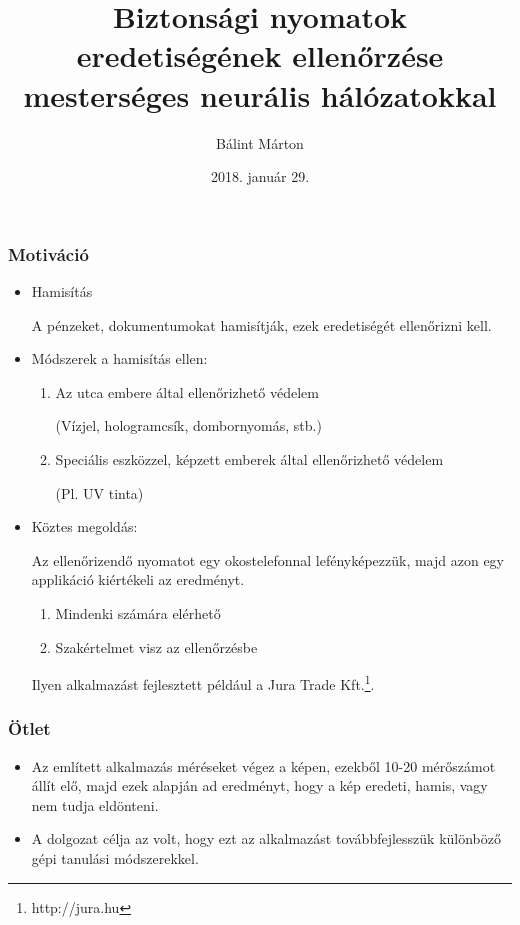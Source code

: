 \documentclass[11pt]{beamer}
\author{Bálint Márton}
\title[Diplomamunka]{Biztonsági nyomatok eredetiségének ellenőrzése mesterséges neurális hálózatokkal}
\institute[ELTE]{Eötvös Loránd Tudományegyetem}
\date{2018. január 29.}
\begin{document}
	
\begin{frame}[plain]
	\maketitle
\end{frame}

\begin{frame}
	\frametitle{Motiváció}
	
	\begin{itemize}
	\item 
		Hamisítás
		
		A pénzeket, dokumentumokat hamisítják, ezek eredetiségét ellenőrizni kell.
		
	\item 
		Módszerek a hamisítás ellen:
	
		\begin{enumerate}
			\item
			Az utca embere által ellenőrizhető védelem
			
			(Vízjel, hologramcsík, dombornyomás, stb.)
			
			\item
			Speciális eszközzel, képzett emberek által ellenőrizhető védelem
			
			(Pl. UV tinta)
		\end{enumerate}
		
	\item 
		Köztes megoldás:
		
		Az ellenőrizendő nyomatot egy okostelefonnal lefényképezzük, majd azon egy applikáció kiértékeli az eredményt. 
		
			\begin{enumerate}
			\item
			Mindenki számára elérhető
			
			\item
			Szakértelmet visz az ellenőrzésbe
			
		\end{enumerate}
		
		Ilyen alkalmazást fejlesztett például a Jura Trade Kft.\footnote{http://jura.hu}. 
		
		
	\end{itemize}

\end{frame}


\begin{frame}
	\frametitle{Ötlet}
	
	
	\begin{itemize}
		\item 
		Az említett alkalmazás méréseket végez a képen, ezekből 10-20 mérőszámot állít elő, majd ezek alapján ad eredményt, hogy a kép eredeti, hamis, vagy nem tudja eldönteni.
		
		\item 
		A dolgozat célja az volt, hogy ezt az alkalmazást továbbfejlesszük különböző gépi tanulási módszerekkel.
		
		
	\end{itemize}
\end{frame}
\end{document}
